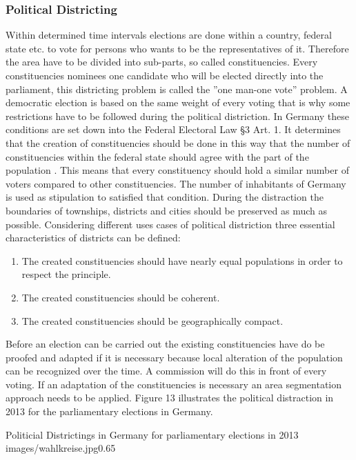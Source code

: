 \subsubsection{Political Districting}

Within determined time intervals elections are done within a country, federal state etc. to vote for persons who wants to be the representatives of it. Therefore the area have to be divided into sub-parts, so called constituencies. Every constituencies nominees one candidate who will be elected directly into the parliament, this districting problem is called the ''one man-one vote'' problem.  A democratic election is based on the same weight of every voting that is why some restrictions have to be followed during the political distriction. In Germany these conditions are set down into the Federal Electoral Law §3 Art. 1. It determines that the creation of constituencies should be done in this way that the number of constituencies within the federal state should agree with the part of the population \cite{bund}. This means that every constituency should hold a similar number of voters compared to other constituencies. The number of inhabitants of Germany is used as stipulation to satisfied that condition. During the distraction the boundaries of townships, districts and cities should be preserved as much as possible. Considering different uses cases of political distriction three essential characteristics of districts can be defined:
\begin{enumerate}
	\item The created constituencies should have nearly equal populations in order to respect the principle.
	\item The  created constituencies should be coherent.
	\item  The created constituencies should be geographically compact.
\end{enumerate}

Before an election can be carried out the existing constituencies have do be proofed and adapted if it is necessary because local alteration of the population can be recognized over the time. A commission will do this in front of every voting. If an adaptation of the constituencies is necessary an area segmentation approach needs to be applied. Figure 13 illustrates the political distraction in 2013 for the parliamentary elections in Germany.


\begin{figurevarSize}{Politicial Districtings in Germany for parliamentary elections in 2013 \cite{bund}}{images/wahlkreise.jpg}{0.65}\end{figurevarSize}


